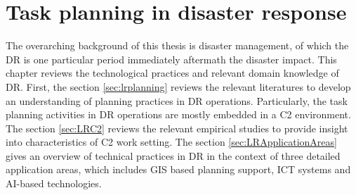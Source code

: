 \chapter{Task planning in disaster response}\label{ch:literatures}
The overarching background of this thesis is disaster management, of which the \acf{DR} is one particular period immediately aftermath the disaster impact. This chapter reviews the technological practices and relevant domain knowledge of \ac{DR}. First, the section \ref{sec:lrplanning} reviews the relevant literatures to develop an understanding of planning practices in \ac{DR} operations. Particularly, the task planning activities in \ac{DR} operations are mostly embedded in a \acf{C2} environment. The section \ref{sec:LRC2} reviews the relevant empirical studies to provide insight into characteristics of \ac{C2} work setting. The section \ref{sec:LRApplicationAreas} gives an overview of technical practices in \ac{DR} in the context of three detailed application areas, which includes \acf{GIS} based planning support, \acf{ICT} systems and \ac{AI}-based technologies. \\



